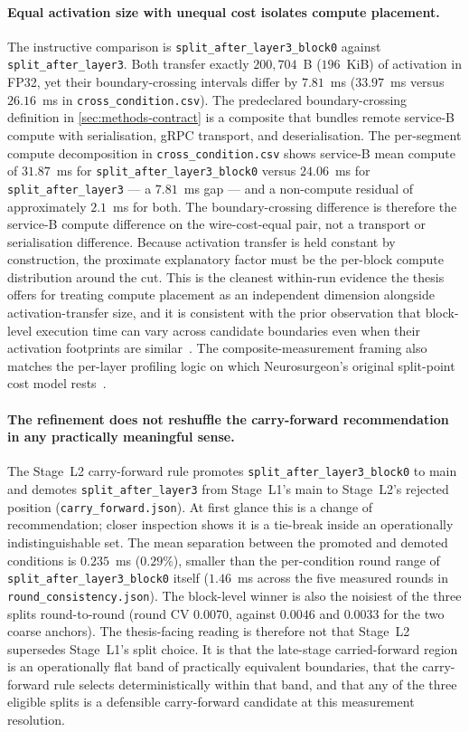 \paragraph{Equal activation size with unequal cost isolates compute placement.}
The instructive comparison is
\texttt{split\_after\_layer3\_block0} against \texttt{split\_after\_layer3}.
Both transfer exactly \(200{,}704\)~B (\(196\)~KiB) of activation in FP32,
yet their boundary-crossing intervals differ by \(7.81\)~ms
(\(33.97\)~ms versus \(26.16\)~ms in \texttt{cross\_condition.csv}). The
predeclared boundary-crossing definition in \cref{sec:methods-contract} is
a composite that bundles remote service-B compute with serialisation,
gRPC transport, and deserialisation. The per-segment compute decomposition
in \texttt{cross\_condition.csv} shows service-B mean compute of
\(31.87\)~ms for \texttt{split\_after\_layer3\_block0} versus
\(24.06\)~ms for \texttt{split\_after\_layer3} --- a \(7.81\)~ms gap --- and a
non-compute residual of approximately \(2.1\)~ms for both. The
boundary-crossing difference is therefore the service-B compute difference
on the wire-cost-equal pair, not a transport or serialisation
difference. Because activation transfer is held constant by construction,
the proximate explanatory factor must be the per-block compute distribution
around the cut. This is the cleanest within-run evidence the thesis offers
for treating compute placement as an independent dimension alongside
activation-transfer size, and it is consistent with the prior observation
that block-level execution time can vary across candidate boundaries even
when their activation footprints are similar~\cite{pareto_split}. The
composite-measurement framing also matches the per-layer profiling logic on
which Neurosurgeon's original split-point cost
model rests~\cite{neurosurgeon}.

\paragraph{The refinement does not reshuffle the carry-forward recommendation in any practically meaningful sense.}
The Stage~L2 carry-forward rule promotes
\texttt{split\_after\_layer3\_block0} to main and demotes
\texttt{split\_after\_layer3} from Stage~L1's main to Stage~L2's rejected
position (\texttt{carry\_forward.json}). At first glance this is a change of
recommendation; closer inspection shows it is a tie-break inside an
operationally indistinguishable set. The mean separation between the
promoted and demoted conditions is \(0.235\)~ms (\(0.29\%\)), smaller than
the per-condition round range of \texttt{split\_after\_layer3\_block0}
itself (\(1.46\)~ms across the five measured rounds in
\texttt{round\_consistency.json}). The block-level winner is also the
noisiest of the three splits round-to-round (round CV \(0.0070\), against
\(0.0046\) and \(0.0033\) for the two coarse anchors). The
thesis-facing reading is therefore not that Stage~L2 supersedes Stage~L1's split
choice. It is that the late-stage carried-forward region is an operationally
flat band of practically equivalent boundaries, that the carry-forward rule
selects deterministically within that band, and that any of the three
eligible splits is a defensible carry-forward candidate at this measurement
resolution.

